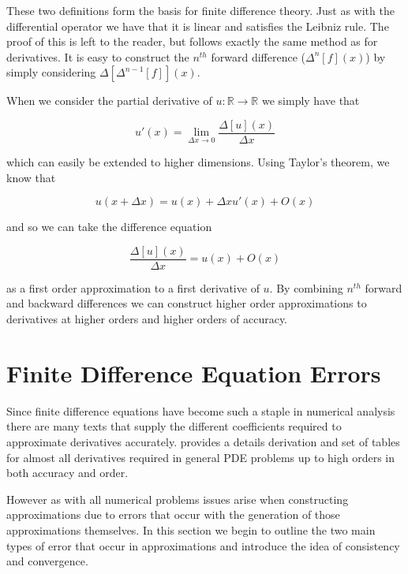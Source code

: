 \documentclass[../main.tex]{subfiles}
\begin{document}
  These two definitions form the basis for finite difference theory. Just as with the differential operator we have that it is linear and satisfies the Leibniz rule. The proof of this is left to the reader, but follows exactly the same method as for derivatives. It is easy to construct the $n^{th}$ forward difference ($\Delta ^n[f](x)$) by simply considering $\Delta [\Delta ^{n-1}[f]](x)$.

  When we consider the partial derivative of $u: \mathbb{R} \to \mathbb{R}$ we simply have that

  \begin{equation}
    u'(x) = \lim_{\Delta x \to 0} \frac{\Delta[u](x)}{\Delta x}
  \end{equation}

  which can easily be extended to higher dimensions. Using Taylor's theorem, we know that

  \begin{equation}
    u(x + \Delta x) = u(x) + \Delta x u'(x) + O(x)
  \end{equation}

  and so we can take the difference equation

  \begin{equation}
    \frac{\Delta[u](x)}{\Delta x} = u(x) + O(x)
  \end{equation}

  as a first order approximation to a first derivative of $u$. By combining $n^{th}$ forward and backward differences we can construct higher order approximations to derivatives at higher orders and higher orders of accuracy.

  \section{Finite Difference Equation Errors}
  Since finite difference equations have become such a staple in numerical analysis there are many texts that supply the different coefficients required to approximate derivatives accurately. \cite{fornberg1988} provides a details derivation and set of tables for almost all derivatives required in general PDE problems up to high orders in both accuracy and order.

  However as with all numerical problems issues arise when constructing approximations due to errors that occur with the generation of those approximations themselves. In this section we begin to outline the two main types of error that occur in approximations and introduce the idea of consistency and convergence.
\end{document}
